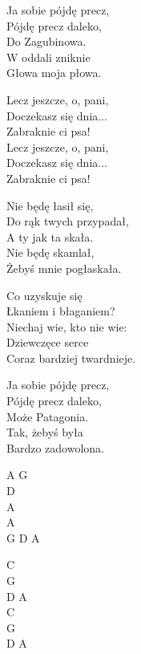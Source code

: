 \begin{text}
    Ja sobie pójdę precz,\\
    Pójdę precz daleko,\\
    Do Zagubinowa.\\
    W oddali zniknie\\
    Głowa moja płowa.

    \vin Lecz jeszcze, o, pani,\\
    \vin Doczekasz się dnia...\\
    \vin Zabraknie ci psa!\\
    \vin Lecz jeszcze, o, pani,\\
    \vin Doczekasz się dnia...\\
    \vin Zabraknie ci psa!

    Nie będę łasił się,\\
    Do rąk twych przypadał,\\
    A ty jak ta skała.\\
    Nie będę skamlał,\\
    Żebyś mnie pogłaskała.

    Co uzyskuje się\\
    Łkaniem i błaganiem?\\
    Niechaj wie, kto nie wie:\\
    Dziewczęce serce\\
    Coraz bardziej twardnieje.

    Ja sobie pójdę precz,\\
    Pójdę precz daleko,\\
    Może Patagonia.\\
    Tak, żebyś była\\
    Bardzo zadowolona.
\end{text}
\begin{chord}
    A G\\
    D\\
    A\\
    A\\
    G D A

    C\\
    G\\
    D A\\
    C\\
    G\\
    D A
\end{chord}